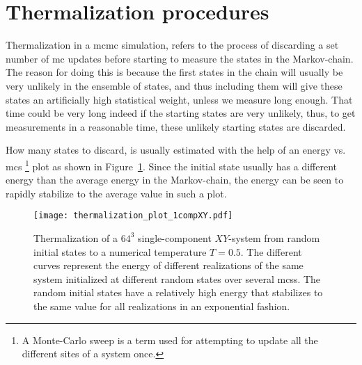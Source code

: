 \section{Thermalization procedures}

Thermalization in a \ac{mcmc} simulation, refers to the process of discarding a set number of \ac{mc} updates before starting to measure the
states in the Markov-chain. The reason for doing this is because the first states in the chain will usually be very unlikely in the
ensemble of states, and thus including them will give these states an artificially high statistical weight, unless we measure long enough.
That time could be very long indeed if the starting states are very unlikely, thus, to get
measurements in a reasonable time, these unlikely starting states are discarded.

How many states to discard, is usually estimated with the help of an energy vs. \ac{mcs}%
\footnote{A Monte-Carlo sweep is a term used for attempting to update all the different sites of a system once.} %
plot as shown in Figure~\ref{fig:Monte:therm_plot}. Since the initial state usually has a different energy than the average energy in the Markov-chain,
the energy can be seen to rapidly stabilize to the average value in such a plot. 

\begin{figure}[t]
    \centering
    \texttt{[image: thermalization\_plot\_1compXY.pdf]}
    \caption{Thermalization of a $64^3$ single-component $XY$-system from random initial states to a numerical temperature $T=0.5$.
    The different curves represent the energy of different realizations of the same
    system initialized at different random states over several \ac{mcs}s. The random initial states have a relatively high energy that stabilizes
    to the same value for all realizations in an exponential fashion.}
    \label{fig:Monte:therm_plot}
\end{figure}

